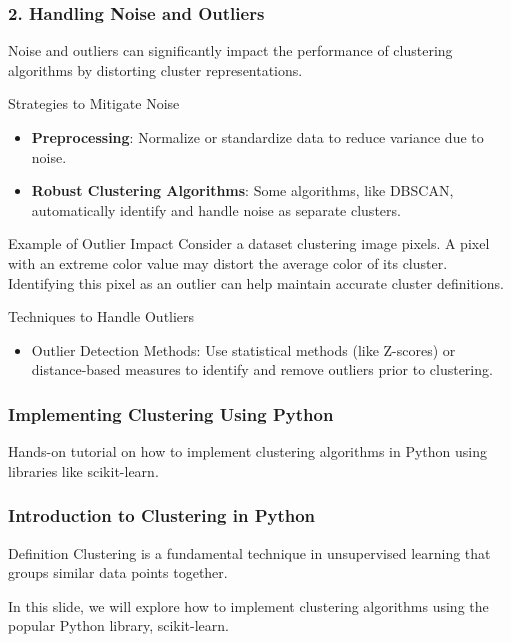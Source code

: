 \documentclass[aspectratio=169]{beamer}
\begin{document}
\begin{frame}[fragile]
  \frametitle{2. Handling Noise and Outliers}
  Noise and outliers can significantly impact the performance of clustering algorithms by distorting cluster representations.
  
  \begin{block}{Strategies to Mitigate Noise}
    \begin{itemize}
      \item \textbf{Preprocessing}: Normalize or standardize data to reduce variance due to noise.
      \item \textbf{Robust Clustering Algorithms}: Some algorithms, like DBSCAN, automatically identify and handle noise as separate clusters.
    \end{itemize}
  \end{block}
  
  \begin{block}{Example of Outlier Impact}
    Consider a dataset clustering image pixels. A pixel with an extreme color value may distort the average color of its cluster. Identifying this pixel as an outlier can help maintain accurate cluster definitions.
  \end{block}

  \begin{block}{Techniques to Handle Outliers}
    \begin{itemize}
      \item Outlier Detection Methods: Use statistical methods (like Z-scores) or distance-based measures to identify and remove outliers prior to clustering.
    \end{itemize}
  \end{block}
\end{frame}

\begin{frame}
    \frametitle{Implementing Clustering Using Python}
    Hands-on tutorial on how to implement clustering algorithms in Python using libraries like scikit-learn.
\end{frame}

\begin{frame}
    \frametitle{Introduction to Clustering in Python}
    \begin{block}{Definition}
        Clustering is a fundamental technique in unsupervised learning that groups similar data points together.
    \end{block}
    In this slide, we will explore how to implement clustering algorithms using the popular Python library, scikit-learn.
\end{frame}
\end{document}
